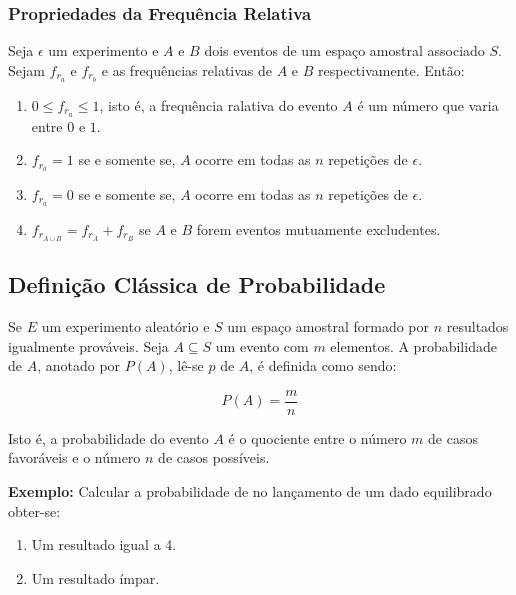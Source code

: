  
\subsubsection{Propriedades da Frequência Relativa} 

\inic Seja $\epsilon$ um experimento e $A$ e $B$ dois eventos de um espaço amostral associado $S$. Sejam $f_{r_{a}}$ e $f_{r_{b}}$ e as frequências relativas de $A$ e $B$ respectivamente. Então:

\begin{enumerate}
    \item $0 \leqslant f_{r_{a}}  \leqslant 1$, isto é, a frequência ralativa do evento $A$ é um número que varia entre $0$ e $1$.
    \item $f_{r_{a}}= 1$ se e somente se, $A$ ocorre em todas as $n$ repetições de $\epsilon$.
    \item $f_{r_{a}}= 0$ se e somente se, $A$ ocorre em todas as $n$ repetições de $\epsilon$.
    \item $f_{r_{A \cup B}}  = f_{r_{A}} + f_{r_{B}}$ se $A$ e $B$ forem eventos mutuamente excludentes.
\end{enumerate}
 
 
 
 
 
\subsection{Definição Clássica de Probabilidade}
 
\inic Se $E$ um experimento aleatório e $S$ um espaço amostral formado por $n$ resultados igualmente prováveis. Seja $A \subseteq S$ um evento com $m$ elementos. A probabilidade de $A$, anotado por $P(A)$, lê-se $p$ de $A$, é definida como sendo:
  
\begin{equation}
     P(A)= \frac{m}{n}
\end{equation}
  
\inic Isto é, a probabilidade do evento $A$ é o quociente entre o número $m$ de casos favoráveis e o número $n$ de casos possíveis.\vskip0.3cm


\textbf{Exemplo:} Calcular a probabilidade de no lançamento de um
dado equilibrado obter-se:

\begin{enumerate}
    \item Um resultado igual a 4.
    \item Um resultado ímpar.
\end{enumerate}

